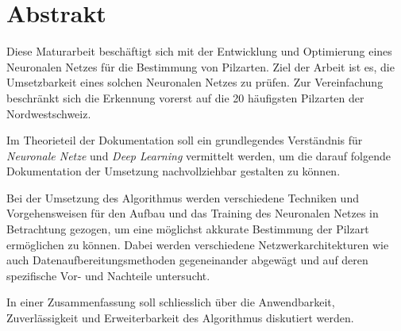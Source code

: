 \section*{Abstrakt}
Diese Maturarbeit beschäftigt sich mit der Entwicklung und Optimierung eines Neuronalen Netzes für die Bestimmung von Pilzarten. Ziel der Arbeit ist es, die Umsetzbarkeit eines solchen Neuronalen Netzes zu prüfen. Zur Vereinfachung beschränkt sich die Erkennung vorerst auf die 20 häufigsten Pilzarten der Nordwestschweiz.

Im Theorieteil der Dokumentation soll ein grundlegendes Verständnis für \textit{Neuronale Netze} und \textit{Deep Learning} vermittelt werden, um die darauf folgende Dokumentation der Umsetzung nachvollziehbar gestalten zu können.

Bei der Umsetzung des Algorithmus werden verschiedene Techniken und Vorgehensweisen für den Aufbau und das Training des Neuronalen Netzes in Betrachtung gezogen, um eine möglichst akkurate Bestimmung der Pilzart ermöglichen zu können. Dabei werden verschiedene Netzwerkarchitekturen wie auch Datenaufbereitungsmethoden gegeneinander abgewägt und auf deren spezifische Vor- und Nachteile untersucht.

In einer Zusammenfassung soll schliesslich über die Anwendbarkeit, Zuverlässigkeit und Erweiterbarkeit des Algorithmus diskutiert werden. 